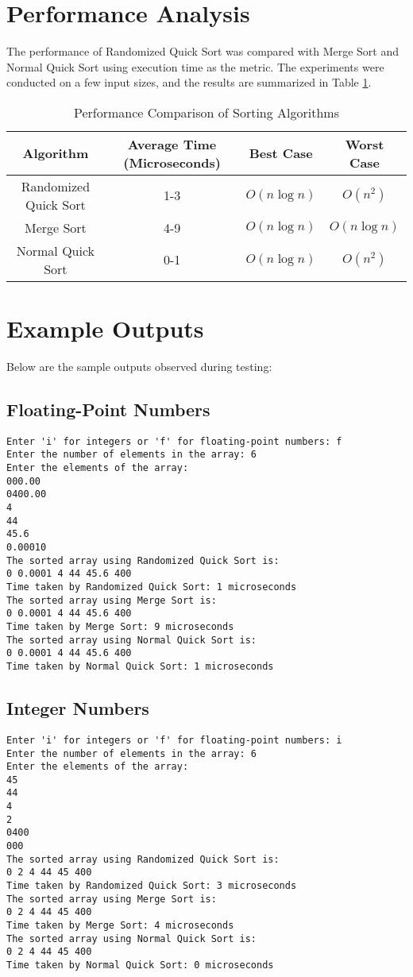 \documentclass{article}
\begin{document}
\section{Performance Analysis}
The performance of Randomized Quick Sort was compared with Merge Sort and Normal Quick Sort using execution time as the metric. The experiments were conducted on a few  input sizes, and the results are summarized in Table \ref{tab:performance}.

\begin{table}[h]
    \centering
    \begin{tabular}{|c|c|c|c|}
        \hline
        Algorithm & Average Time (Microseconds) & Best Case & Worst Case \\
        \hline
        Randomized Quick Sort & 1-3 & $O(n \log n)$ & $O(n^2)$ \\
        Merge Sort & 4-9 & $O(n \log n)$ & $O(n \log n)$ \\
        Normal Quick Sort & 0-1 & $O(n \log n)$ & $O(n^2)$ \\
        \hline
    \end{tabular}
    \caption{Performance Comparison of Sorting Algorithms}
    \label{tab:performance}
\end{table}

\section{Example Outputs}
Below are the sample outputs observed during testing:

\subsection{Floating-Point Numbers}
\begin{verbatim}
Enter 'i' for integers or 'f' for floating-point numbers: f
Enter the number of elements in the array: 6
Enter the elements of the array:
000.00
0400.00
4
44
45.6
0.00010
The sorted array using Randomized Quick Sort is:
0 0.0001 4 44 45.6 400
Time taken by Randomized Quick Sort: 1 microseconds
The sorted array using Merge Sort is:
0 0.0001 4 44 45.6 400
Time taken by Merge Sort: 9 microseconds
The sorted array using Normal Quick Sort is:
0 0.0001 4 44 45.6 400
Time taken by Normal Quick Sort: 1 microseconds
\end{verbatim}

\subsection{Integer Numbers}
\begin{verbatim}
Enter 'i' for integers or 'f' for floating-point numbers: i
Enter the number of elements in the array: 6
Enter the elements of the array:
45
44
4
2
0400
000
The sorted array using Randomized Quick Sort is:
0 2 4 44 45 400
Time taken by Randomized Quick Sort: 3 microseconds
The sorted array using Merge Sort is:
0 2 4 44 45 400
Time taken by Merge Sort: 4 microseconds
The sorted array using Normal Quick Sort is:
0 2 4 44 45 400
Time taken by Normal Quick Sort: 0 microseconds
\end{verbatim}
\end{document}
